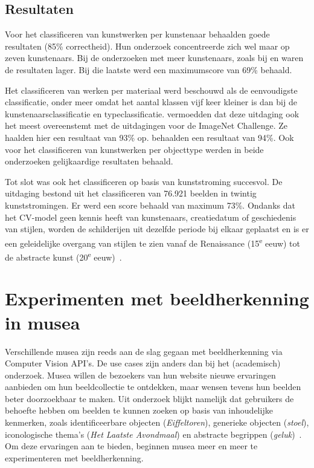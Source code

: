 \subsection{Resultaten}
\label{subsec:cv-voor-ce-resultaten}

Voor het classificeren van kunstwerken per kunstenaar behaalden \textcite{Blessings2013} goede resultaten (85\% correctheid). Hun onderzoek concentreerde zich wel maar op zeven kunstenaars. Bij de onderzoeken met meer kunstenaars, zoals bij \textcite{Mensink2014} en \textcite{Sabatteli2018} waren de resultaten lager. Bij die laatste werd een maximumscore van 69\% behaald.

Het classificeren van werken per materiaal werd beschouwd als de eenvoudigste classificatie, onder meer omdat het aantal klassen vijf keer kleiner is dan bij de kunstenaarsclassificatie en typeclassificatie. \textcite{Sabatteli2018} vermoedden dat deze uitdaging ook het meest overeenstemt met de uitdagingen voor de ImageNet Challenge. Ze haalden hier een resultaat van 93\% op. \textcite{Mensink2014} behaalden een resultaat van 94\%. Ook voor het classificeren van kunstwerken per objecttype werden in beide onderzoeken gelijkaardige resultaten behaald.

Tot slot was ook het classificeren op basis van kunststroming succesvol. De uitdaging bestond uit het classificeren van 76.921 beelden in twintig kunststromingen. Er werd een score behaald van maximum 73\%. Ondanks dat het CV-model geen kennis heeft van kunstenaars, creatiedatum of geschiedenis van stijlen, worden de schilderijen uit dezelfde periode bij elkaar geplaatst en is er een geleidelijke overgang van stijlen te zien vanaf de Renaissance (15\textsuperscript{e} eeuw) tot de abstracte kunst (20\textsuperscript{e} eeuw)~\autocite{Elgammal2018}.

\newpage

\section{Experimenten met beeldherkenning in musea}
\label{sec:beeldherkenning-musea}

Verschillende musea zijn reeds aan de slag gegaan met beeldherkenning via Computer Vision API’s. De use cases zijn anders dan bij het (academisch) onderzoek. Musea willen de bezoekers van hun website nieuwe ervaringen aanbieden om hun beeldcollectie te ontdekken, maar wensen tevens hun beelden beter doorzoekbaar te maken. Uit onderzoek blijkt namelijk dat gebruikers de behoefte hebben om beelden te kunnen zoeken op basis van inhoudelijke kenmerken, zoals identificeerbare objecten (\textit{Eiffeltoren}), generieke objecten (\textit{stoel}), iconologische thema’s (\textit{Het Laatste Avondmaal}) en abstracte begrippen (\textit{geluk})~\autocite{Vanstappen2019}. Om deze ervaringen aan te bieden, beginnen musea meer en meer te experimenteren met beeldherkenning.


